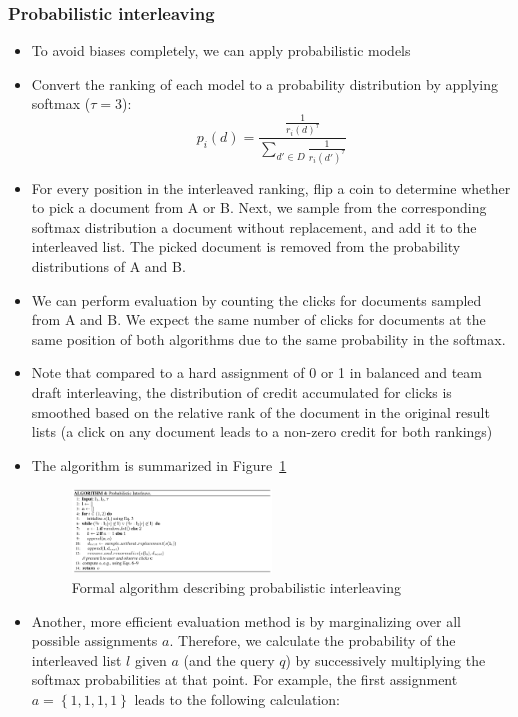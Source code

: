 \subsubsection{Probabilistic interleaving}
\begin{itemize}
	\item To avoid biases completely, we can apply probabilistic models
	\item Convert the ranking of each model to a probability distribution by applying softmax ($\tau = 3$):
	$$p_i(d) = \frac{\frac{1}{r_i(d)^{\tau}}}{\sum_{d' \in D} \frac{1}{r_i(d')^{\tau}}}$$
	\item For every position in the interleaved ranking, flip a coin to determine whether to pick a document from A or B. Next, we sample from the corresponding softmax distribution a document without replacement, and add it to the interleaved list. The picked document is removed from the probability distributions of A and B. 
	\item We can perform evaluation by counting the clicks for documents sampled from A and B. We expect the same number of clicks for documents at the same position of both algorithms due to the same probability in the softmax. %
	\item Note that compared to a hard assignment of 0 or 1 in balanced and team draft interleaving, the distribution of credit accumulated for clicks is smoothed based on the relative rank of the document in the original result lists (a click on any document leads to a non-zero credit for both rankings)
	\item The algorithm is summarized in Figure~\ref{img:online_eval_probabilistic_interleaving}
	\begin{figure}[ht]
		\centering
		\includegraphics[width=0.5\textwidth]{figures/online_eval_probabilistic_interleaving.png}
		\caption{Formal algorithm describing probabilistic interleaving}
		\label{img:online_eval_probabilistic_interleaving}
	\end{figure}
	\item Another, more efficient evaluation method is by marginalizing over all possible assignments $a$. Therefore, we calculate the probability of the interleaved list $l$ given $a$ (and the query $q$) by successively multiplying the softmax probabilities at that point. For example, the first assignment $a=\left\{1,1,1,1\right\}$ leads to the following calculation:

\end{itemize}
